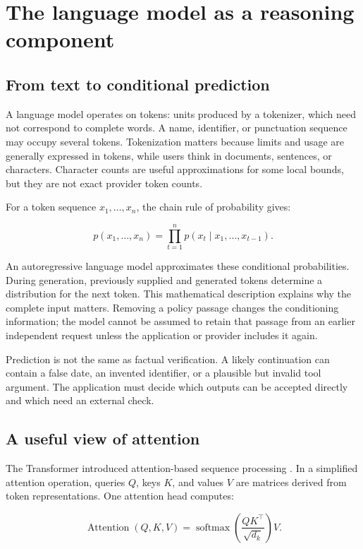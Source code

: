 \chapter{The language model as a reasoning component}
\section{From text to conditional prediction}
A language model operates on tokens: units produced by a tokenizer, which need not correspond to complete words. A name, identifier, or punctuation sequence may occupy several tokens. Tokenization matters because limits and usage are generally expressed in tokens, while users think in documents, sentences, or characters. Character counts are useful approximations for some local bounds, but they are not exact provider token counts.

For a token sequence \(x_1,\ldots,x_n\), the chain rule of probability gives:

\begin{equation}
p(x_1,\ldots,x_n)=\prod_{t=1}^{n}p(x_t\mid x_1,\ldots,x_{t-1}).
\end{equation}

An autoregressive language model approximates these conditional probabilities. During generation, previously supplied and generated tokens determine a distribution for the next token. This mathematical description explains why the complete input matters. Removing a policy passage changes the conditioning information; the model cannot be assumed to retain that passage from an earlier independent request unless the application or provider includes it again.

Prediction is not the same as factual verification. A likely continuation can contain a false date, an invented identifier, or a plausible but invalid tool argument. The application must decide which outputs can be accepted directly and which need an external check.

\section{A useful view of attention}
The Transformer introduced attention-based sequence processing \cite{transformer}. In a simplified attention operation, queries \(Q\), keys \(K\), and values \(V\) are matrices derived from token representations. One attention head computes:

\begin{equation}
\operatorname{Attention}(Q,K,V)=\operatorname{softmax}\left(\frac{QK^\top}{\sqrt{d_k}}\right)V.
\end{equation}

